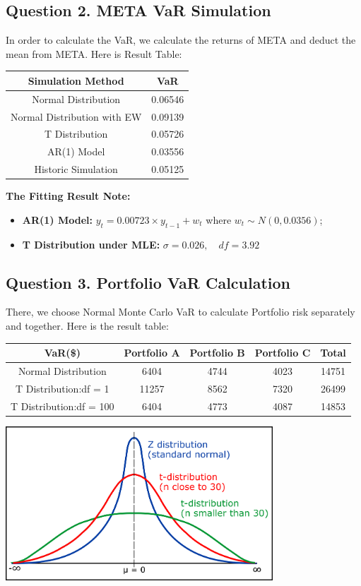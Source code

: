\documentclass[a4paper,12pt]{article}
\begin{document}
\subsection*{Question 2. META VaR Simulation}
In order to calculate the VaR, we calculate the returns of META and deduct the mean from META. Here is Result Table:\\
\begin{center}
    \begin{tabular}{ c|c}
     \hline
     Simulation Method & VaR\\
     \hline
     Normal Distribution&0.06546\\
     Normal Distribution with EW&0.09139 \\
     T Distribution&0.05726 \\
     AR(1) Model& 0.03556\\
     Historic Simulation& 0.05125\\
     \hline
    \end{tabular}
\end{center}
\textbf{The Fitting Result Note:}
\begin{itemize}
    \item  \textbf{AR(1) Model:} $y_{t} = 0.00723\times y_{t-1} + w_{t}$ where $w_{t} \sim N(0,0.0356)$;
    \item \textbf{T Distribution under MLE:} $\sigma = 0.026,\quad df = 3.92$
\end{itemize}
\newpage
\subsection*{Question 3. Portfolio VaR Calculation}
There, we choose Normal Monte Carlo VaR to calculate Portfolio risk separately and together. Here is the result table:\\
\begin{center}
    \begin{tabular}{ c|c|c|c|c}
     \hline
      VaR(\$) & Portfolio A & Portfolio B & Portfolio C & Total\\
     \hline
     Normal Distribution&6404&4744&4023&14751\\
     T Distribution:df = 1&11257&8562&7320&26499\\
     T Distribution:df = 100&6404&4773&4087&14853\\
     \hline
    \end{tabular}
\end{center}
\begin{center}
    \includegraphics[width=10cm]{t_distribution.png}
\end{center}
\end{document}
